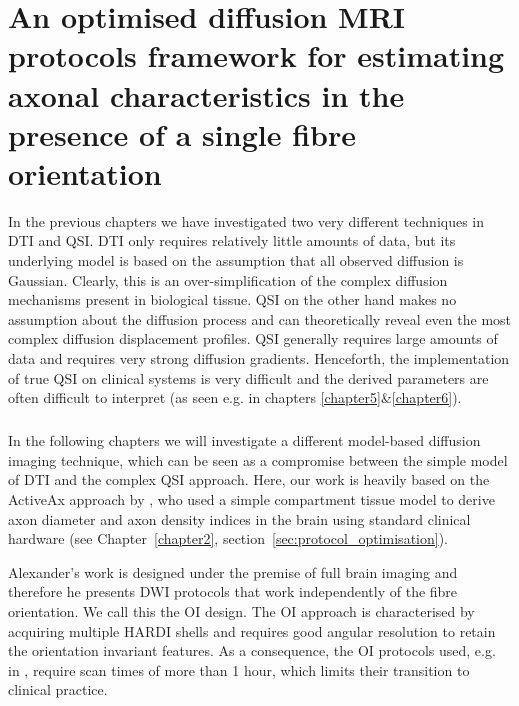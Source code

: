 \chapter{An optimised diffusion MRI protocols framework for estimating axonal characteristics in the presence of a single fibre orientation}
\label{chapter7}
\glsresetall %
In the previous chapters we have investigated two very different techniques in \gls{DTI} and \gls{QSI}. \gls{DTI} only requires relatively little amounts of data, but its underlying model is based on the assumption that all observed diffusion is Gaussian. Clearly, this is an over-simplification of the complex diffusion mechanisms present in biological tissue. \gls{QSI} on the other hand makes no assumption about the diffusion process and can theoretically reveal even the most complex diffusion displacement profiles. \gls{QSI} generally requires large amounts of data and requires very strong diffusion gradients. Henceforth, the implementation of true \gls{QSI} on clinical systems is very difficult and the derived parameters are often difficult to interpret (as seen e.g. in chapters \ref{chapter5}\&\ref{chapter6}).
\paragraph{}
In the following chapters we will investigate a different model-based diffusion imaging technique, which can be seen as a compromise between the simple model of \gls{DTI} and the complex \gls{QSI} approach. Here, our work is heavily based on the ActiveAx approach by \citet{Alexander:2008}, who used a simple compartment tissue model to derive axon diameter and axon density indices in the brain using standard clinical hardware (see Chapter~\ref{chapter2}, section~\ref{sec:protocol_optimisation}).


Alexander's work is designed under the premise of full brain imaging and therefore he presents DWI protocols that work independently of the fibre orientation. We call this the \gls{OI} design. The \gls{OI} approach is characterised by acquiring multiple \gls{HARDI} shells and requires good angular resolution to retain the orientation invariant features. As a consequence, the {\gls{OI}} protocols used, e.g. in \citep{Alexander:2010}, require scan times of more than 1 hour, which limits their transition to clinical practice.


